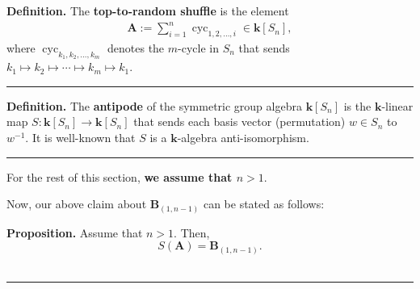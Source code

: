 \documentclass[12pt]{article}
\theoremstyle{definition}%
\newtheorem{prop}[thm]{Proposition}
\theoremstyle{definition}%
\newtheorem{defn}[thm]{Definition}
\theoremstyle{remark}%
\newcommand{\tup}[1]{\left( #1 \right)}
\newcommand{\cyc}[1]{\operatorname{cyc}_{#1}}
\newcommand{\kk}{\mathbf{k}}
\newcommand{\ksn}{\kk\left[S_n\right]}
\newcommand{\A}{\mathbf{A}}
\newcommand{\BB}{\mathbf{B}}
\newcommand{\defin}[1]{\textbf{#1}}
\newenvironment{prop}[1][Proposition]{\noindent\textbf{#1.} }{\ \rule{0.5em}{0.5em}}
\newenvironment{defn}[1][Definition]{\noindent\textbf{#1.} }{\ \rule{0.5em}{0.5em}}
\begin{document}
\begin{defn}
The \defin{top-to-random shuffle} is the element
\begin{align}
\A := \sum_{i=1}^n \cyc{1,2,\ldots,i} \in \ksn ,
\label{eq.A=sum-cyc}
\end{align}
where $\cyc{k_1,k_2,\ldots,k_m}$ denotes the $m$-cycle in $S_n$ that sends $k_1 \mapsto k_2 \mapsto \cdots \mapsto k_m \mapsto k_1$.
\end{defn}

\begin{defn}
The \defin{antipode} of the symmetric group algebra $\ksn$ is the $\kk$-linear map $S : \ksn \to \ksn$ that sends each basis vector (permutation) $w \in S_n$ to $w^{-1}$.
It is well-known that $S$ is a $\kk$-algebra anti-isomorphism.
\end{defn}

For the rest of this section, \textbf{we assume that $n > 1$}.

Now, our above claim about $\BB_{\tup{1, n-1}}$ can be stated as follows:

\begin{prop}
\label{prop.BBa-A}
Assume that $n > 1$. Then,
\[
S\tup{\A} = \BB_{\tup{1, n-1}}.
\]
\end{prop}
\end{document}
